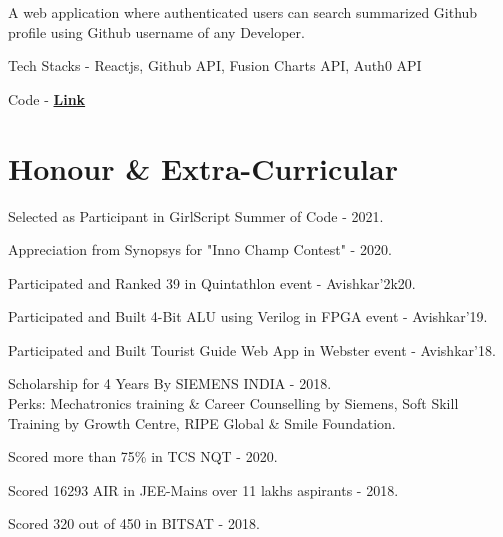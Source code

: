 \documentclass[]{deedy-resume-openfont}
\begin{document}
\begin{minipage}[t]{0.66\textwidth}
\location{}
\begin{tightemize}
\item A web application where authenticated users can search summarized Github profile using Github username of any Developer. 
\item Tech Stacks - Reactjs, Github API, Fusion Charts API, Auth0 API
\item Code - \href{https://github.com/PSoni8/Developer-s-Book}{\bf Link} 
\end{tightemize}

\sectionsep

\section{Honour \& Extra-Curricular}

\location{}
\begin{tightemize}
\item Selected as Participant in GirlScript Summer of Code - 2021.\\
\item Appreciation from Synopsys for "Inno Champ Contest" - 2020.\\
\item Participated and Ranked 39 in Quintathlon event - Avishkar'2k20.\\
\item Participated and Built 4-Bit ALU using Verilog in FPGA event - Avishkar'19.\\
\item Participated and Built Tourist Guide Web App in Webster event - Avishkar'18.\\
\end{tightemize}
\sectionsep

\location{}
\begin{tightemize}
\item Scholarship for 4 Years By SIEMENS INDIA - 2018.\\ Perks: Mechatronics training \& Career Counselling by Siemens, Soft Skill Training by Growth Centre, RIPE Global \& Smile Foundation.\\
\end{tightemize}
\sectionsep

\location{}
\begin{tightemize}
\item Scored more than 75\% in TCS NQT - 2020.\\
\item Scored 16293 AIR in JEE-Mains over 11 lakhs aspirants - 2018.\\ 
\item Scored 320 out of 450 in BITSAT - 2018.\\
\end{tightemize}
\sectionsep


\end{minipage}
\end{document}
